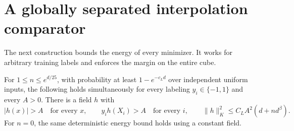 \section{A globally separated interpolation comparator}
\label{sec:comparator}
The next construction bounds the energy of every minimizer. It works
for arbitrary training labels and enforces the margin on the entire cube.

\begin{lemma}\label{lem:comparator}
For $1\le n\le e^{d/25}$, with probability at least $1-e^{-c_Ld}$
over independent uniform inputs, the following holds simultaneously for
every labeling $y_i\in\{-1,1\}$ and every $A>0$.
There is a field $h$ with
\[
 |h(x)|>A\quad\text{for every }x,\qquad
 y_i h(X_i)>A\quad\text{for every }i,
 \qquad \|h\|_K^2\le C_L A^2(d+n d^\beta).
\]
For $n=0$, the same deterministic energy bound holds using a constant field.
\end{lemma}
